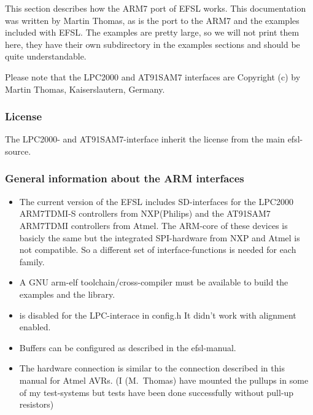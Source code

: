 This section describes how the ARM7 port of EFSL works. This documentation was written
by Martin Thomas, as is the port to the ARM7 and the examples included with EFSL.
The examples are pretty large, so we will not print them here, they have their own
subdirectory in the examples sections and should be quite understandable.

Please note that the LPC2000 and AT91SAM7 interfaces are Copyright (c) by Martin Thomas, Kaiserslautern, Germany.

\subsubsection{License}
The LPC2000- and AT91SAM7-interface inherit the license from the main efsl-source.

\subsubsection{General information about the ARM interfaces}
	\begin{itemize}
	
\item The current version of the EFSL includes SD-interfaces
for the LPC2000 ARM7TDMI-S controllers from NXP(Philips) and 
the AT91SAM7 ARM7TDMI controllers from Atmel. The ARM-core 
of these devices is basicly the same but the integrated
SPI-hardware from NXP and Atmel is not compatible. So
a different set of interface-functions is needed for each
family.

\item A GNU arm-elf toolchain/cross-compiler
must be available to build the examples
and the library.

\item {} is disabled
for the LPC-interace in config.h 
It didn't work with alignment enabled.

\item Buffers can be configured as
described in the efsl-manual.

\item The hardware connection is similar 
to the connection described
in this manual for Atmel AVRs.
(I (M.~Thomas) have mounted the pullups in some of my
test-systems but tests have been done 
successfully without pull-up resistors)
	\end{itemize}

